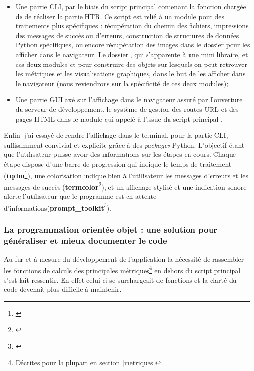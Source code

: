 \begin{itemize}
    \item Une partie CLI, par le biais du script principal  contenant la fonction chargée de de réaliser la partie HTR. Ce script est relié à un module pour des traitements plus spécifiques  : récupération du chemin des fichiers, impressions des messages de succès ou d'erreurs, construction de structures de données Python spécifiques, ou encore récupération des images dans le dossier  pour les afficher dans le navigateur. Le dossier , qui s'apparente à une mini libraire, et ces deux modules  et  pour construire des objets sur lesquels on peut retrouver les métriques et les visualisations graphiques, dans le but de les afficher dans le navigateur (nous reviendrons sur la spécificité de ces deux modules);\\
     \item Une partie GUI axé sur l'affichage dans le navigateur assuré par l'ouverture du serveur de développement, le système de gestion des routes URL et des pages HTML dans le module  qui appelé à l'issue du script principal .
\end{itemize}
\bigskip
Enfin, j'ai essayé de rendre l'affichage dans le terminal, pour la partie CLI, suffisamment convivial et explicite grâce à des \textit{packages} Python. L'objectif étant que l'utilisateur puisse avoir des informations sur les étapes en cours. Chaque étape dispose d'une barre de progression qui indique le temps de traitement (\textbf{tqdm}\footnote{\cite{noauthor_tqdm_nodate}}), une colorisation indique bien à l'utilisateur les messages d'erreurs et les messages de succès (\textbf{termcolor}\footnote{\cite{noauthor_termcolor_nodate}}), et un affichage stylisé et une indication sonore alerte l'utilisateur que le programme est en attente d'informations(\textbf{prompt\_toolkit}\footnote{\cite{noauthor_prompt-toolkit_nodate}}). 

\newpage
\subsubsection{La programmation orientée objet : une solution pour généraliser et mieux documenter le code}

Au fur et à mesure du développement de l'application la nécessité de rassembler les fonctions de calculs des principales métriques\footnote{Décrites pour la plupart en section \ref{metriques}} en dehors du script principal  s'est fait ressentir. En effet celui-ci se surchargeait de fonctions et la clarté du code devenait plus difficile à maintenir. 

